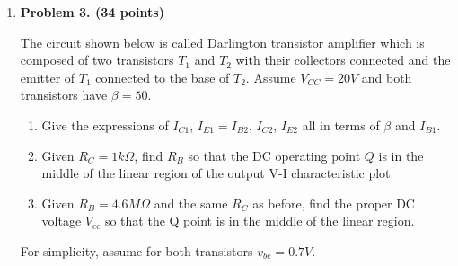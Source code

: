\begin{enumerate}

% 
% 
% 


\item {\bf Problem 3. (34 points)} 

The circuit shown below is called Darlington transistor amplifier which is
composed of two transistors $T_1$ and $T_2$ with their collectors connected 
and the emitter of $T_1$ connected to the base of $T_2$. Assume $V_{CC}=20V$ 
and both transistors have $\beta=50$. 
\begin{enumerate}
\item Give the expressions of $I_{C1}$, $I_{E1}=I_{B2}$, $I_{C2}$, $I_{E2}$
  all in terms of $\beta$ and $I_{B1}$.
\item Given $R_C=1 k\Omega$, find $R_B$ so that the DC operating point $Q$
  is in the middle of the linear region of the output V-I characteristic plot.
\item Given $R_B= 4.6 M\Omega$ and the same $R_C$ as before, find the proper 
DC voltage $V_{cc}$ so that the Q point is in the middle of the linear region.
\end{enumerate}
For simplicity, assume for both transistors $v_{be}=0.7V$.


%

%

\end{enumerate}



